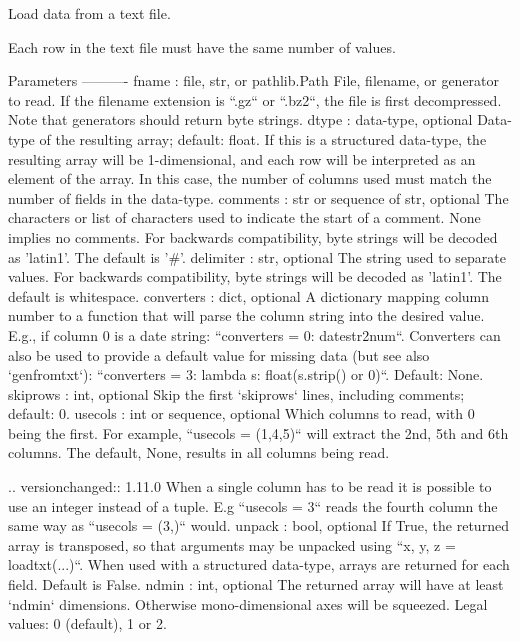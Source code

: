 \begin{DoxyVerb}Load data from a text file.

Each row in the text file must have the same number of values.

Parameters
----------
fname : file, str, or pathlib.Path
    File, filename, or generator to read.  If the filename extension is
    ``.gz`` or ``.bz2``, the file is first decompressed. Note that
    generators should return byte strings.
dtype : data-type, optional
    Data-type of the resulting array; default: float.  If this is a
    structured data-type, the resulting array will be 1-dimensional, and
    each row will be interpreted as an element of the array.  In this
    case, the number of columns used must match the number of fields in
    the data-type.
comments : str or sequence of str, optional
    The characters or list of characters used to indicate the start of a
    comment. None implies no comments. For backwards compatibility, byte
    strings will be decoded as 'latin1'. The default is '#'.
delimiter : str, optional
    The string used to separate values. For backwards compatibility, byte
    strings will be decoded as 'latin1'. The default is whitespace.
converters : dict, optional
    A dictionary mapping column number to a function that will parse the
    column string into the desired value.  E.g., if column 0 is a date
    string: ``converters = {0: datestr2num}``.  Converters can also be
    used to provide a default value for missing data (but see also
    `genfromtxt`): ``converters = {3: lambda s: float(s.strip() or 0)}``.
    Default: None.
skiprows : int, optional
    Skip the first `skiprows` lines, including comments; default: 0.
usecols : int or sequence, optional
    Which columns to read, with 0 being the first. For example,
    ``usecols = (1,4,5)`` will extract the 2nd, 5th and 6th columns.
    The default, None, results in all columns being read.

    .. versionchanged:: 1.11.0
        When a single column has to be read it is possible to use
        an integer instead of a tuple. E.g ``usecols = 3`` reads the
        fourth column the same way as ``usecols = (3,)`` would.
unpack : bool, optional
    If True, the returned array is transposed, so that arguments may be
    unpacked using ``x, y, z = loadtxt(...)``.  When used with a
    structured data-type, arrays are returned for each field.
    Default is False.
ndmin : int, optional
    The returned array will have at least `ndmin` dimensions.
    Otherwise mono-dimensional axes will be squeezed.
    Legal values: 0 (default), 1 or 2.


\end{DoxyVerb}
